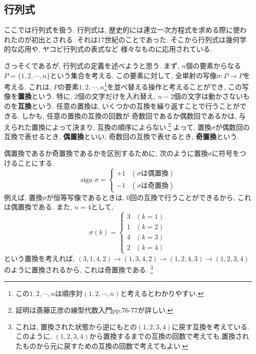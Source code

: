 \documentclass[a4j,dvipdfmx]{jsarticle}
\numberwithin{equation}{section}
\newcommand{\sign}{\mathop{\mathrm{sign}}\nolimits}
\begin{document}
        \subsection{行列式}
            ここでは行列式を扱う. 行列式は, 歴史的には連立一次方程式を求める際に使われたのが初出とされる. それは17世紀のことであった. そこから行列式は幾何学的な応用や, ヤコビ行列式の表式など
            様々なものに応用されている. 

            さっそくであるが, 行列式の定義を述べようと思う. まず, $n$個の要素からなる$P=\{1,2,\cdots,n\}$という集合を考える. この要素に対して, 全単射の写像$\sigma:P\rightarrow P$を考える.
            これは, $P$の要素$1,2,\cdots,n$\footnote{この$1,2,\cdots,n$は順序対$(1,2,\cdots,n)$と考えるとわかりやすい.}を並べ替える操作と考えることができ, この写像を\textbf{置換}という.
            特に, $2$個の文字だけを入れ替え, $n-2$個の文字は動かさないものを\textbf{互換}という. 任意の置換は, いくつかの互換を繰り返すことで行うことができる. しかも, 任意の置換の互換の回数が
            奇数回であるか偶数回であるかは, 与えられた置換によって決まり, 互換の順序によらない.\footnote{証明は斎藤正彦の線型代数入門pp.76-77が詳しい.}
            よって, 置換$\sigma$が偶数回の互換で表せるとき, \textbf{偶置換}といい, 奇数回の互換で表せるとき, \textbf{奇置換}という.

            偶置換であるか奇置換であるかを区別するために, 次のように置換$\sigma$に符号をつけることにする.
            \begin{equation}
                \sign \sigma = \left\{\begin{array}{cc}
                    +1 & (\sigma は偶置換) \\ -1 & (\sigma は奇置換)
                \end{array}\right. \label{eq:線形代数:置換の定義}
            \end{equation}
            例えば, 置換$\sigma$が恒等写像であるときは, 0回の互換で行うことができるから, これは偶置換である. また, $n=4$として, 
            \begin{equation*}
                \sigma(k) = \left\{\begin{array}{cc}
                    3 & (k=1) \\ 1 & (k=2) \\ 4 & (k=3) \\ 2 & (k=4)
                \end{array}\right.
            \end{equation*}
            という置換を考えれば, $(3,1,4,2)\rightarrow(1,3,4,2)\rightarrow(1,2,4,3)\rightarrow(1,2,3,4)$のように置換されるから, これは奇置換である. 
            \footnote{これは, 置換された状態から逆にもとの$(1,2,3,4)$に戻す互換を考えている. このように, $(1,2,3,4)$から置換するまでの互換の回数で考えても,置換されたものから元に戻すための互換の回数で考えてもよい.}\\
            
\end{document}
